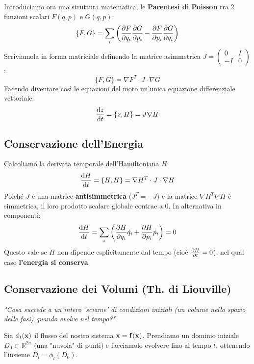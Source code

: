 \documentclass[openany]{book}
\theoremstyle{definition}
\theoremstyle{remark}
\newcommand{\R}{\mathbb{R}}
\begin{document}
Introduciamo ora una struttura matematica, le \textbf{Parentesi di Poisson} tra 2 funzioni scalari $F(q,p)$ e $G(q,p)$:
\begin{equation}
    \{ F, G \} = \sum_{i} \left( \pdv{F}{q_i}\pdv{G}{p_i} - \pdv{F}{p_i}\pdv{G}{q_i} \right)
\end{equation}
Scriviamola in forma matriciale definendo la matrice asimmetrica $J = \begin{pmatrix} 0 & I \\ -I & 0 \end{pmatrix}$:
\begin{equation}
    \{ F, G \} = \nabla F^T \cdot J \cdot \nabla G
\end{equation}
Facendo diventare così le equazioni del moto un'unica equazione differenziale vettoriale:
\begin{equation}
    \dv{z}{t} = \{ z, H \} = J \nabla H
\end{equation}

\subsection*{Conservazione dell'Energia}
Calcoliamo la derivata temporale dell'Hamiltoniana $H$:
\begin{equation*}
    \dv{H}{t} = \{ H, H \} = \nabla H^T \cdot J \cdot \nabla H
\end{equation*}
Poiché $J$ è una matrice \textbf{antisimmetrica} ($J^T = -J$) e la matrice $\nabla H^T \nabla H$ è simmetrica, il loro prodotto scalare globale contrae a $0$. In alternativa in componenti:
\begin{equation*}
    \dv{H}{t} = \sum_{i} \left( \pdv{H}{q_i}\dot{q}_i + \pdv{H}{p_i}\dot{p}_i \right) = 0
\end{equation*}
Questo vale se $H$ non dipende esplicitamente dal tempo (cioè $\pdv{H}{t} = 0$), nel qual caso \textbf{l'energia si conserva}.

\subsection*{Conservazione dei Volumi (Th. di Liouville)}
\textit{"Cosa succede a un intero 'sciame' di condizioni iniziali (un volume nello spazio delle fasi) quando evolve nel tempo?"}

Sia $\phi_t(\vb{x})$ il flusso del nostro sistema $\dot{\vb{x}} = \vb{f}(\vb{x})$. Prendiamo un dominio iniziale $D_0 \subset \R^{2n}$ (una "nuvola" di punti) e facciamolo evolvere fino al tempo $t$, ottenendo l'insieme $D_t = \phi_t(D_0)$. 
\end{document}
